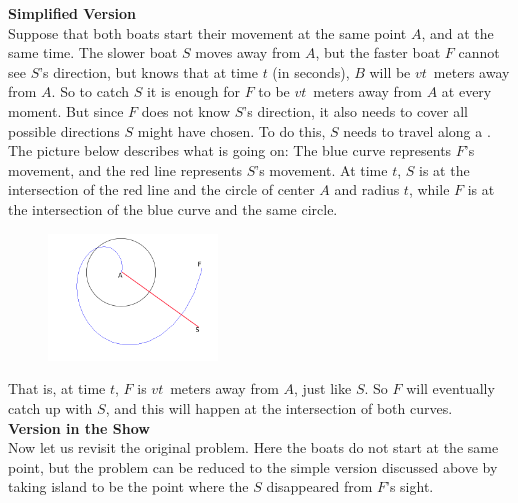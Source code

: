 {\begin{minipage}{43em}
\begin{figure}[H]
\begin{minipage}[b]{0.37\textwidth}
	  \end{minipage}
	\end{figure}
\end{minipage}} \vspace{0.4cm} 



\noindent\textbf{\large Simplified Version} \\

Suppose that both boats start their movement at the same point $A$, and at the same time. The slower boat $S$ moves away from $A$, but the faster boat $F$ cannot see $S$'s direction, but knows that at time $t$ (in seconds), $B$ will be $vt$~meters away from $A$. So to catch $S$ it is enough for $F$ to be $vt$~meters away from $A$ at every moment. But since $F$ does not know $S$'s direction, it also needs to cover all possible directions $S$ might have chosen. To do this, $S$ needs to travel along a . The picture below describes what is going on: The blue curve represents $F$'s movement, and the red line represents $S$'s movement. At time $t$, $S$ is at the intersection of the red line and the circle of center $A$ and radius $t$, while $F$ is at the intersection of the blue curve and the same circle. 
	\begin{figure}[H]
	   \centering
	   \includegraphics[width=0.4\textwidth]{season3/302/images/spiral.png} 
	\end{figure}
That is, at time $t$, $F$ is $vt$~meters away from $A$, just like $S$. So $F$ will eventually catch up with $S$, and this will happen at the intersection of both curves. \\

\noindent\textbf{\large Version in the Show} \\

Now let us revisit the original problem. Here the boats do not start at the same point, but the problem can be reduced to the simple version discussed above by taking island to be the point where the $S$ disappeared from $F$'s sight. \\

